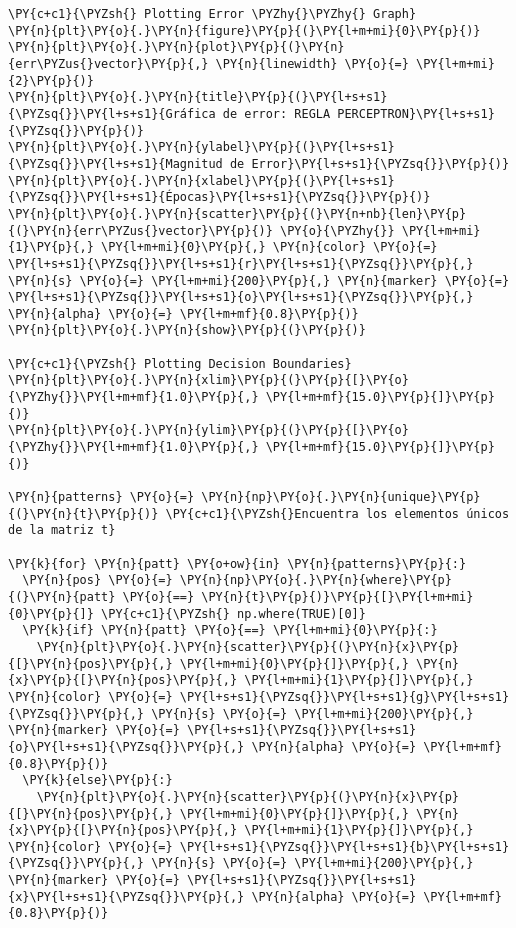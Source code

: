     \begin{tcolorbox}[breakable, size=fbox, boxrule=1pt, pad at break*=1mm,colback=cellbackground, colframe=cellborder]
\begin{Verbatim}[commandchars=\\\{\}]
\PY{c+c1}{\PYZsh{} Plotting Error \PYZhy{}\PYZhy{} Graph}
\PY{n}{plt}\PY{o}{.}\PY{n}{figure}\PY{p}{(}\PY{l+m+mi}{0}\PY{p}{)}
\PY{n}{plt}\PY{o}{.}\PY{n}{plot}\PY{p}{(}\PY{n}{err\PYZus{}vector}\PY{p}{,} \PY{n}{linewidth} \PY{o}{=} \PY{l+m+mi}{2}\PY{p}{)}
\PY{n}{plt}\PY{o}{.}\PY{n}{title}\PY{p}{(}\PY{l+s+s1}{\PYZsq{}}\PY{l+s+s1}{Gráfica de error: REGLA PERCEPTRON}\PY{l+s+s1}{\PYZsq{}}\PY{p}{)}
\PY{n}{plt}\PY{o}{.}\PY{n}{ylabel}\PY{p}{(}\PY{l+s+s1}{\PYZsq{}}\PY{l+s+s1}{Magnitud de Error}\PY{l+s+s1}{\PYZsq{}}\PY{p}{)}
\PY{n}{plt}\PY{o}{.}\PY{n}{xlabel}\PY{p}{(}\PY{l+s+s1}{\PYZsq{}}\PY{l+s+s1}{Épocas}\PY{l+s+s1}{\PYZsq{}}\PY{p}{)}
\PY{n}{plt}\PY{o}{.}\PY{n}{scatter}\PY{p}{(}\PY{n+nb}{len}\PY{p}{(}\PY{n}{err\PYZus{}vector}\PY{p}{)} \PY{o}{\PYZhy{}} \PY{l+m+mi}{1}\PY{p}{,} \PY{l+m+mi}{0}\PY{p}{,} \PY{n}{color} \PY{o}{=} \PY{l+s+s1}{\PYZsq{}}\PY{l+s+s1}{r}\PY{l+s+s1}{\PYZsq{}}\PY{p}{,} \PY{n}{s} \PY{o}{=} \PY{l+m+mi}{200}\PY{p}{,} \PY{n}{marker} \PY{o}{=} \PY{l+s+s1}{\PYZsq{}}\PY{l+s+s1}{o}\PY{l+s+s1}{\PYZsq{}}\PY{p}{,} \PY{n}{alpha} \PY{o}{=} \PY{l+m+mf}{0.8}\PY{p}{)}
\PY{n}{plt}\PY{o}{.}\PY{n}{show}\PY{p}{(}\PY{p}{)}

\PY{c+c1}{\PYZsh{} Plotting Decision Boundaries}
\PY{n}{plt}\PY{o}{.}\PY{n}{xlim}\PY{p}{(}\PY{p}{[}\PY{o}{\PYZhy{}}\PY{l+m+mf}{1.0}\PY{p}{,} \PY{l+m+mf}{15.0}\PY{p}{]}\PY{p}{)}
\PY{n}{plt}\PY{o}{.}\PY{n}{ylim}\PY{p}{(}\PY{p}{[}\PY{o}{\PYZhy{}}\PY{l+m+mf}{1.0}\PY{p}{,} \PY{l+m+mf}{15.0}\PY{p}{]}\PY{p}{)}

\PY{n}{patterns} \PY{o}{=} \PY{n}{np}\PY{o}{.}\PY{n}{unique}\PY{p}{(}\PY{n}{t}\PY{p}{)} \PY{c+c1}{\PYZsh{}Encuentra los elementos únicos de la matriz t}

\PY{k}{for} \PY{n}{patt} \PY{o+ow}{in} \PY{n}{patterns}\PY{p}{:}
  \PY{n}{pos} \PY{o}{=} \PY{n}{np}\PY{o}{.}\PY{n}{where}\PY{p}{(}\PY{n}{patt} \PY{o}{==} \PY{n}{t}\PY{p}{)}\PY{p}{[}\PY{l+m+mi}{0}\PY{p}{]} \PY{c+c1}{\PYZsh{} np.where(TRUE)[0]}
  \PY{k}{if} \PY{n}{patt} \PY{o}{==} \PY{l+m+mi}{0}\PY{p}{:}
    \PY{n}{plt}\PY{o}{.}\PY{n}{scatter}\PY{p}{(}\PY{n}{x}\PY{p}{[}\PY{n}{pos}\PY{p}{,} \PY{l+m+mi}{0}\PY{p}{]}\PY{p}{,} \PY{n}{x}\PY{p}{[}\PY{n}{pos}\PY{p}{,} \PY{l+m+mi}{1}\PY{p}{]}\PY{p}{,} \PY{n}{color} \PY{o}{=} \PY{l+s+s1}{\PYZsq{}}\PY{l+s+s1}{g}\PY{l+s+s1}{\PYZsq{}}\PY{p}{,} \PY{n}{s} \PY{o}{=} \PY{l+m+mi}{200}\PY{p}{,} \PY{n}{marker} \PY{o}{=} \PY{l+s+s1}{\PYZsq{}}\PY{l+s+s1}{o}\PY{l+s+s1}{\PYZsq{}}\PY{p}{,} \PY{n}{alpha} \PY{o}{=} \PY{l+m+mf}{0.8}\PY{p}{)}
  \PY{k}{else}\PY{p}{:}
    \PY{n}{plt}\PY{o}{.}\PY{n}{scatter}\PY{p}{(}\PY{n}{x}\PY{p}{[}\PY{n}{pos}\PY{p}{,} \PY{l+m+mi}{0}\PY{p}{]}\PY{p}{,} \PY{n}{x}\PY{p}{[}\PY{n}{pos}\PY{p}{,} \PY{l+m+mi}{1}\PY{p}{]}\PY{p}{,} \PY{n}{color} \PY{o}{=} \PY{l+s+s1}{\PYZsq{}}\PY{l+s+s1}{b}\PY{l+s+s1}{\PYZsq{}}\PY{p}{,} \PY{n}{s} \PY{o}{=} \PY{l+m+mi}{200}\PY{p}{,} \PY{n}{marker} \PY{o}{=} \PY{l+s+s1}{\PYZsq{}}\PY{l+s+s1}{x}\PY{l+s+s1}{\PYZsq{}}\PY{p}{,} \PY{n}{alpha} \PY{o}{=} \PY{l+m+mf}{0.8}\PY{p}{)}


\end{Verbatim}
\end{tcolorbox}
